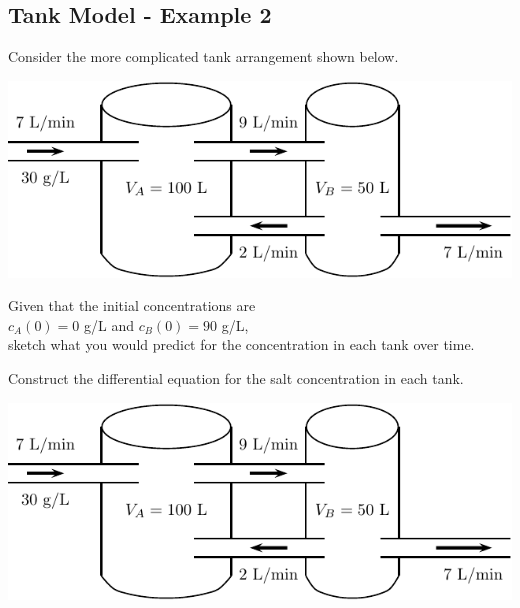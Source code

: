 \subsection*{Tank Model - Example 2}

Consider the more complicated tank arrangement shown below.
\begin{center}
\includegraphics[width=0.7\linewidth]{graphics/notes_09_tanks2}
\end{center}
\begin{problem}
Given that the initial concentrations are \\
$c_A(0) = 0 $ g/L and $c_B(0)  = 90$ g/L,  \\
sketch what you would predict for the concentration in each tank over time.
\end{problem}

\newpage
\begin{minipage}[h]{0.5\linewidth}
\vspace{0pt}
\begin{problem}
  Construct the differential equation for the salt concentration in
  each tank.
\end{problem}
\end{minipage} \hfill
\begin{minipage}[h]{0.45\linewidth}
\vspace{0pt}
\includegraphics[width=1.0\linewidth]{graphics/notes_09_tanks2}
\end{minipage}


